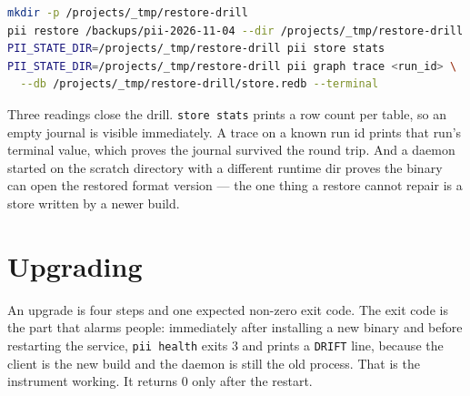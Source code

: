 \begin{center}
\end{center}

\begin{lstlisting}[language=bash]
mkdir -p /projects/_tmp/restore-drill
pii restore /backups/pii-2026-11-04 --dir /projects/_tmp/restore-drill
PII_STATE_DIR=/projects/_tmp/restore-drill pii store stats
PII_STATE_DIR=/projects/_tmp/restore-drill pii graph trace <run_id> \
  --db /projects/_tmp/restore-drill/store.redb --terminal
\end{lstlisting}

Three readings close the drill. \texttt{store stats} prints a row count per table, so an
empty journal is visible immediately. A trace on a known run id prints that run's terminal
value, which proves the journal survived the round trip. And a daemon started on the
scratch directory with a different runtime dir proves the binary can open the restored
format version --- the one thing a restore cannot repair is a store written by a newer
build.

\section{Upgrading}

An upgrade is four steps and one expected non-zero exit code. The exit code is the part
that alarms people: immediately after installing a new binary and before restarting the
service, \texttt{pii health} exits 3 and prints a \texttt{DRIFT} line, because the client
is the new build and the daemon is still the old process. That is the instrument working.
It returns 0 only after the restart.

